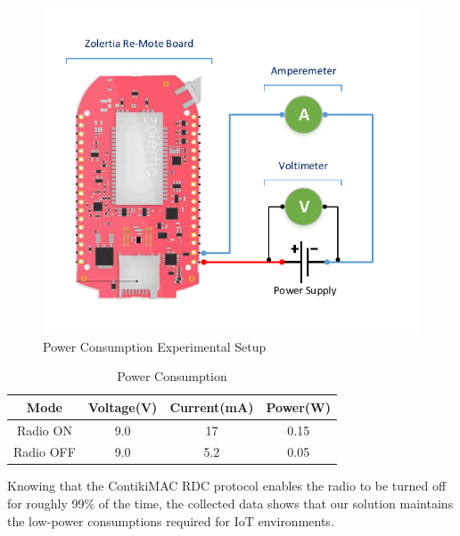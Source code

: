 \begin{figure}
  \centering
  \includegraphics[width=0.65\linewidth]{figures/PowerExperiment.pdf}
  \caption{Power Consumption Experimental Setup}
  \label{fig:experimental_setup}
\end{figure}

\begin{table}
\centering
\caption{Power Consumption}
\label{tab:power_consumptions}
\begin{tabular}{|c|c|c|c|} \hline
Mode&Voltage(V)&Current(mA)&Power(W)\\ \hline
Radio ON& 9.0& 17&0.15\\ \hline
Radio OFF& 9.0& 5.2&0.05\\ 
\hline\end{tabular}
\end{table}

Knowing that the ContikiMAC \gls{RDC} protocol enables the radio to be turned off for roughly 99\% of the time\cite{Dunkels2011}, the collected data shows that our solution maintains the low-power consumptions required for \gls{IoT} environments.

